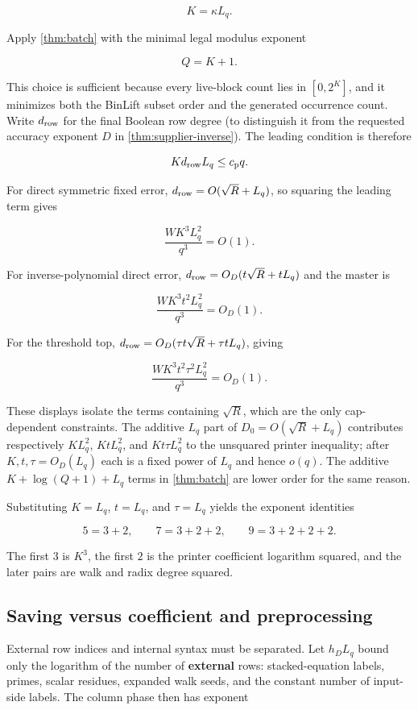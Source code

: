 \documentclass[11pt,letterpaper]{article}
\newcommand{\cref}[1]{\ref{#1}}
\theoremstyle{definition}
\theoremstyle{remark}
\begin{document}
\[
K=\kappa L_q.
\]

Apply \cref{thm:batch} with the minimal
legal modulus exponent

\[
Q=K+1.
\]

This choice is sufficient because every live-block count lies in
\([0,2^K]\), and it minimizes both the BinLift subset order and the
generated occurrence count. Write \(d_{\rm row}\) for the final Boolean
row degree (to distinguish it from the requested accuracy exponent \(D\)
in \cref{thm:supplier-inverse}). The leading condition is therefore

\[
K d_{\rm row}L_q\le c_{\mathrm p}q.
\]

For direct symmetric fixed error, \(d_{\rm row}=O(\sqrt R+L_q)\), so
squaring the leading term gives

\[
\frac{WK^3L_q^2}{q^3}=O(1).
\]

For inverse-polynomial direct error, \(d_{\rm row}=O_D(t\sqrt R+tL_q)\)
and the master is

\[
\frac{WK^3t^2L_q^2}{q^3}=O_D(1).
\]

For the threshold top, \(d_{\rm row}=O_D(\tau t\sqrt R+\tau tL_q)\),
giving

\[
\frac{WK^3t^2\tau^2L_q^2}{q^3}=O_D(1).
\]

These displays isolate the terms containing \(\sqrt R\), which are the
only cap-dependent constraints. The additive \(L_q\) part of
\(D_0=O(\sqrt R+L_q)\) contributes respectively \(K L_q^2\),
\(KtL_q^2\), and \(Kt\tau L_q^2\) to the unsquared printer inequality;
after \(K,t,\tau=O_D(L_q)\) each is a fixed power of \(L_q\) and hence
\(o(q)\). The additive \(K+\log(Q+1)+L_q\) terms in \cref{thm:batch} are
lower order for the same reason.

Substituting \(K=L_q\), \(t=L_q\), and \(\tau=L_q\) yields the exponent
identities

\[
5=3+2,
\qquad
7=3+2+2,
\qquad
9=3+2+2+2.
\]

The first \(3\) is \(K^3\), the first \(2\) is the printer coefficient
logarithm squared, and the later pairs are walk and radix degree
squared.

\subsection{Saving versus coefficient and
preprocessing}\label{a8-saving-versus-coefficient-and-preprocessing}

External row indices and internal syntax must be separated. Let
\(h_D L_q\) bound only the logarithm of the number of \textbf{external}
rows: stacked-equation labels, primes, scalar residues, expanded walk
seeds, and the constant number of input-side labels. The column phase
then has exponent
\end{document}
